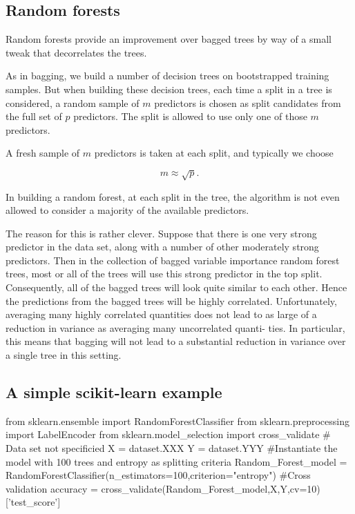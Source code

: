 \documentclass[%
oneside,                 %
final,                   %
10pt]{article}
\begin{document}
\epycod


\subsection{Random forests}

Random forests provide an improvement over bagged trees by way of a
small tweak that decorrelates the trees. 

As in bagging, we build a
number of decision trees on bootstrapped training samples. But when
building these decision trees, each time a split in a tree is
considered, a random sample of $m$ predictors is chosen as split
candidates from the full set of $p$ predictors. The split is allowed to
use only one of those $m$ predictors. 

A fresh sample of $m$ predictors is
taken at each split, and typically we choose 

\[
m\approx \sqrt{p}.
\]

In building a random forest, at
each split in the tree, the algorithm is not even allowed to consider
a majority of the available predictors. 

The reason for this is rather clever. Suppose that there is one very
strong predictor in the data set, along with a number of other
moderately strong predictors. Then in the collection of bagged
variable importance random forest trees, most or all of the trees will
use this strong predictor in the top split. Consequently, all of the
bagged trees will look quite similar to each other. Hence the
predictions from the bagged trees will be highly correlated.
Unfortunately, averaging many highly correlated quantities does not
lead to as large of a reduction in variance as averaging many
uncorrelated quanti- ties. In particular, this means that bagging will
not lead to a substantial reduction in variance over a single tree in
this setting.

\subsection{A simple scikit-learn example}
\bpycod
from sklearn.ensemble import RandomForestClassifier
from sklearn.preprocessing import LabelEncoder
from sklearn.model_selection import cross_validate
# Data set not specificied
X = dataset.XXX
Y = dataset.YYY
#Instantiate the model with 100 trees and entropy as splitting criteria
Random_Forest_model = RandomForestClassifier(n_estimators=100,criterion="entropy")
#Cross validation
accuracy = cross_validate(Random_Forest_model,X,Y,cv=10)['test_score']
\epycod
\end{document}
